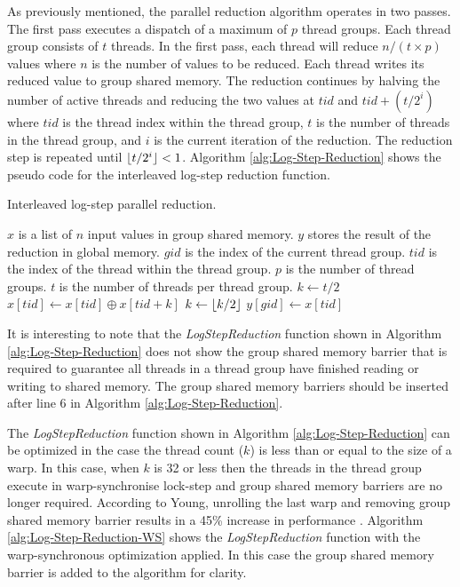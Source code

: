 As previously mentioned, the parallel reduction algorithm operates in two passes. The first pass executes a dispatch of a maximum of $p$ thread groups. Each thread group consists of $t$ threads. In the first pass, each thread will reduce $n/(t \times p)$  values where $n$ is the number of values to be reduced. Each thread writes its reduced value to group shared memory. The reduction continues by halving the number of active threads and reducing the two values at $tid$ and $tid+(t/2^i)$ where $tid$ is the thread index within the thread group, $t$ is the number of threads in the thread group, and $i$ is the current iteration of the reduction. The reduction step is repeated until $\lfloor t/2^i\rfloor < 1$. Algorithm \ref{alg:Log-Step-Reduction} shows the pseudo code for the interleaved log-step reduction function.

\begin{algorithm}[h]
\caption{Interleaved log-step parallel reduction.}
\label{alg:Log-Step-Reduction}
\begin{algorithmic}[1]
\Require $x$ is a list of $n$ input values in group shared memory.
\Require $y$ stores the result of the reduction in global memory.
\Require $gid$ is the index of the current thread group.
\Require $tid$ is the index of the thread within the thread group.
\Require $p$ is the number of thread groups.
\Require $t$ is the number of threads per thread group.
\State $k \gets t/2$
\State $x[tid] \gets x[tid] \oplus x[tid+k]$
\EndIf
\State $k \gets \lfloor k/2\rfloor$
\EndWhile
{}
\State $y[gid] \gets x[tid]$
\EndIf
\EndFunction
\end{algorithmic}
\end{algorithm}

It is interesting to note that the \emph{LogStepReduction} function shown in Algorithm \ref{alg:Log-Step-Reduction} does not show the group shared memory barrier that is required to guarantee all threads in a thread group have finished reading or writing to shared memory. The group shared memory barriers should be inserted after line 6 in Algorithm \ref{alg:Log-Step-Reduction}.

The \emph{LogStepReduction} function shown in Algorithm \ref{alg:Log-Step-Reduction} can be optimized in the case the thread count ($k$) is less than or equal to the size of a warp. In this case, when $k$ is 32 or less then the threads in the thread group execute in warp-synchronise lock-step and group shared memory barriers are no longer required. According to Young, unrolling the last warp and removing group shared memory barrier results in a 45\% increase in performance \parencite{29_young_2010}. Algorithm \ref{alg:Log-Step-Reduction-WS} shows the \emph{LogStepReduction} function with the warp-synchronous optimization applied. In this case the group shared memory barrier is added to the algorithm for clarity.

